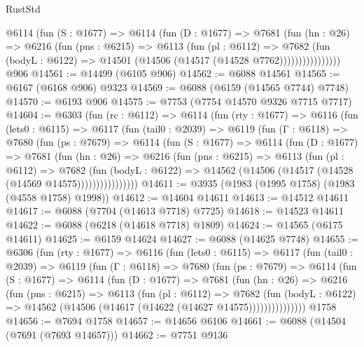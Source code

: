 \begin{lexlean}{RustStd}
\begin{coremodule}
                @6114
                  (fun (S : @1677) =>
                  @6114
                    (fun (D : @1677) =>
                    @7681
                      (fun (hn : @26) =>
                      @6216
                        (fun (pns : @6215) =>
                        @6113
                          (fun (pl : @6112) =>
                          @7682
                            (fun (bodyL : @6122) =>
                            @14501 (@14506 (@14517 (@14528 @7762))))))))))))))))
    @906
@14561 := @14499 (@6105 @906)
@14562 := @6088 @14561
@14565 := @6167 (@6168 @906) @9323
@14569 := @6088 (@6159 (@14565 @7744) @7748)
@14570 := @6193 @906
@14575 := @7753 (@7754 @14570 @9326 @7715 @7717)
@14604 := @6303
    (fun (rc : @6112) =>
    @6114
      (fun (rty : @1677) =>
      @6116
        (fun (lets0 : @6115) =>
        @6117
          (fun (tail0 : @2039) =>
          @6119
            (fun (Γ : @6118) =>
            @7680
              (fun (ps : @7679) =>
              @6114
                (fun (S : @1677) =>
                @6114
                  (fun (D : @1677) =>
                  @7681
                    (fun (hn : @26) =>
                    @6216
                      (fun (pns : @6215) =>
                      @6113
                        (fun (pl : @6112) =>
                        @7682
                          (fun (bodyL : @6122) =>
                          @14562 (@14506 (@14517 (@14528 (@14569 @14575))))))))))))))))
@14611 := @3935 (@1983 (@1995 @1758) (@1983 (@4558 @1758) @1998))
@14612 := @14604 @14611
@14613 := @14512 @14611
@14617 := @6088 (@7704 (@14613 @7718) @7725)
@14618 := @14523 @14611
@14622 := @6088 (@6218 (@14618 @7718) @1809)
@14624 := @14565 (@6175 @14611)
@14625 := @6159 @14624
@14627 := @6088 (@14625 @7748)
@14655 := @6306
    (fun (rty : @1677) =>
    @6116
      (fun (lets0 : @6115) =>
      @6117
        (fun (tail0 : @2039) =>
        @6119
          (fun (Γ : @6118) =>
          @7680
            (fun (ps : @7679) =>
            @6114
              (fun (S : @1677) =>
              @6114
                (fun (D : @1677) =>
                @7681
                  (fun (hn : @26) =>
                  @6216
                    (fun (pns : @6215) =>
                    @6113
                      (fun (pl : @6112) =>
                      @7682
                        (fun (bodyL : @6122) =>
                        @14562 (@14506 (@14617 (@14622 (@14627 @14575)))))))))))))))
    @1758
@14656 := @7694 @1758
@14657 := @14656 @6106
@14661 := @6088 (@14504 (@7691 (@7693 @14657)))
@14662 := @7751 @9136

\end{coremodule}
\end{lexlean}
